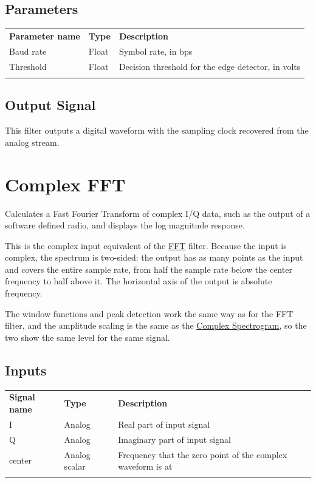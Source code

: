 \subsection{Parameters}

\begin{tabularx}{16cm}{llX}
\thickhline
\textbf{Parameter name} & \textbf{Type} & \textbf{Description} \\
\thickhline
Baud rate & Float & Symbol rate, in bps \\
\thinhline
Threshold & Float & Decision threshold for the edge detector, in volts \\
\thickhline
\end{tabularx}

\subsection{Output Signal}

This filter outputs a digital waveform with the sampling clock recovered from the analog stream.

\pagebreak
\section{Complex FFT}
\label{filter:complexfft}

Calculates a Fast Fourier Transform of complex I/Q data, such as the output of a software defined radio, and displays
the log magnitude response.

This is the complex input equivalent of the \hyperref[filter:fft]{FFT} filter. Because the input is complex, the
spectrum is two-sided: the output has as many points as the input and covers the entire sample rate, from half the
sample rate below the center frequency to half above it. The horizontal axis of the output is absolute frequency.

The window functions and peak detection work the same way as for the FFT filter, and the amplitude scaling is the same
as the \hyperref[filter:complexspectrogram]{Complex Spectrogram}, so the two show the same level for the same signal.

\subsection{Inputs}

\begin{tabularx}{16cm}{llX}
\thickhline
\textbf{Signal name} & \textbf{Type} & \textbf{Description} \\
\thickhline
I & Analog & Real part of input signal\\
\thinhline
Q & Analog & Imaginary part of input signal\\
\thinhline
center & Analog scalar & Frequency that the zero point of the complex waveform is at\\
\thickhline
\end{tabularx}

